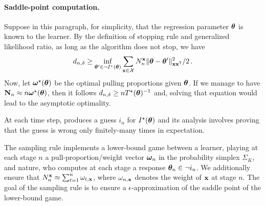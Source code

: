\paragraph{Saddle-point computation.}
Suppose in this paragraph, for simplicity, that the regression parameter ${\boldsymbol \theta}$ is known to the learner. By the definition of stopping rule and generalized likelihood ratio, as long as the algorithm does not stop, we have
\begin{align*}
    d_{n,\delta} \ge \inf_{{\boldsymbol \theta}'\in \neg I^\star({\boldsymbol \theta})} \sum_{{\bf x}\in \mathcal{X}} N_n^{\bf x} \Vert {\boldsymbol \theta} - {\boldsymbol \theta}' \Vert^2_{{\bf x}{\bf x}^\mathsf{\scriptscriptstyle T}}/2\,.
\end{align*}
Now, let ${\boldsymbol \omega}^\star({\boldsymbol \theta})$ be the optimal pulling proportions given ${\boldsymbol \theta}$. If we manage to have ${\bf N}_n \approx n{\boldsymbol \omega}^\star({\boldsymbol \theta})$, then it follows $d_{n,\delta} \ge n T^\star({\boldsymbol \theta})^{-1}$ and, solving that equation would lead to the asymptotic optimality.


At each time step, \LG{} produces a guess $i_n$ for $I^\star({\boldsymbol \theta})$ and its analysis involves proving that the guess is wrong only finitely-many times in expectation.

The sampling rule implements a lower-bound game between a learner, playing at each stage $n$ a pull-proportion/weight vector ${\boldsymbol \omega}_n$ in the probability simplex $\Sigma_K$, and nature, who computes at each stage a response ${\boldsymbol \theta}_n \in \neg i_n$. We additionally ensure that $N_n^{\bf x} \approx \sum_{t=1}^n \omega_{t,{\bf x}}$, where $\omega_{n,{\bf x}}$ denotes the weight of ${\bf x}$ at stage $n$. The goal of the sampling rule is to ensure a $\epsilon$-approximation of the saddle point of the lower-bound game.

